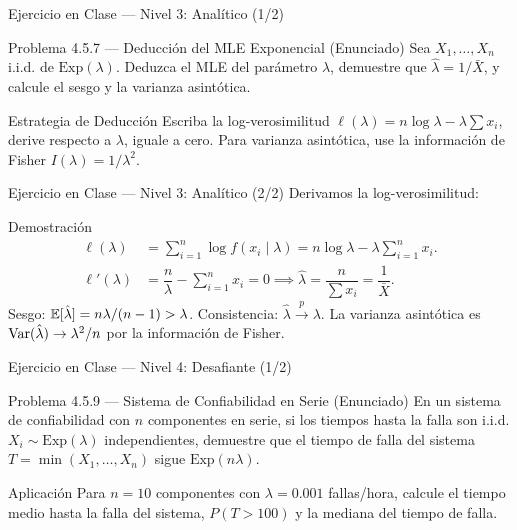 \documentclass[10pt, aspectratio=169]{beamer}
\begin{document}
\begin{frame}{Ejercicio en Clase --- Nivel 3: Analítico (1/2)}
  \footnotesize
  \begin{block}{Problema 4.5.7 --- Deducción del MLE Exponencial (Enunciado)}
    Sea $X_{1}, \dots, X_{n}$ i.i.d. de $\text{Exp}(\lambda)$. Deduzca el MLE del parámetro $\lambda$, demuestre que $\hat{\lambda} = 1/\bar{X}$, y calcule el sesgo y la varianza asintótica.
  \end{block}

  \vspace{0.1cm}
  \pause
  \begin{alertblock}{Estrategia de Deducción}
    \scriptsize
    Escriba la log-verosimilitud $\ell(\lambda) = n \log \lambda - \lambda \sum x_i$, derive respecto a $\lambda$, iguale a cero. Para varianza asintótica, use la información de Fisher $I(\lambda) = 1/\lambda^{2}$.
  \end{alertblock}
\end{frame}

\begin{frame}{Ejercicio en Clase --- Nivel 3: Analítico (2/2)}
  \scriptsize
  Derivamos la log-verosimilitud: \pause

  \vspace{0.05cm}
  \begin{block}{Demostración}
    \scriptsize
    \begin{align*}
      \ell(\lambda) &= \sum_{i=1}^{n} \log f(x_i \mid \lambda) = n \log \lambda - \lambda \sum_{i=1}^{n} x_i. \\
      \ell'(\lambda) &= \dfrac{n}{\lambda} - \sum_{i=1}^{n} x_i = 0 \implies \hat{\lambda} = \dfrac{n}{\sum x_i} = \dfrac{1}{\bar{X}}.
    \end{align*}
    Sesgo: $\mathbb{E}[\hat{\lambda}] = n\lambda/(n-1) > \lambda$. Consistencia: $\hat{\lambda} \xrightarrow{p} \lambda$. La varianza asintótica es $\operatorname{Var}(\hat{\lambda}) \to \lambda^{2}/n$ por la información de Fisher. \quad \qedhere
  \end{block}
\end{frame}

\begin{frame}{Ejercicio en Clase --- Nivel 4: Desafiante (1/2)}
  \footnotesize
  \begin{block}{Problema 4.5.9 --- Sistema de Confiabilidad en Serie (Enunciado)}
    En un sistema de confiabilidad con $n$ componentes en serie, si los tiempos hasta la falla son i.i.d. $X_{i} \sim \text{Exp}(\lambda)$ independientes, demuestre que el tiempo de falla del sistema $T = \min(X_{1}, \dots, X_{n})$ sigue $\text{Exp}(n\lambda)$.
  \end{block}

  \vspace{0.15cm}
  \pause
  \begin{alertblock}{Aplicación}
    \scriptsize
    Para $n = 10$ componentes con $\lambda = 0.001$ fallas/hora, calcule el tiempo medio hasta la falla del sistema, $P(T > 100)$ y la mediana del tiempo de falla.
  \end{alertblock}
\end{frame}
\end{document}
